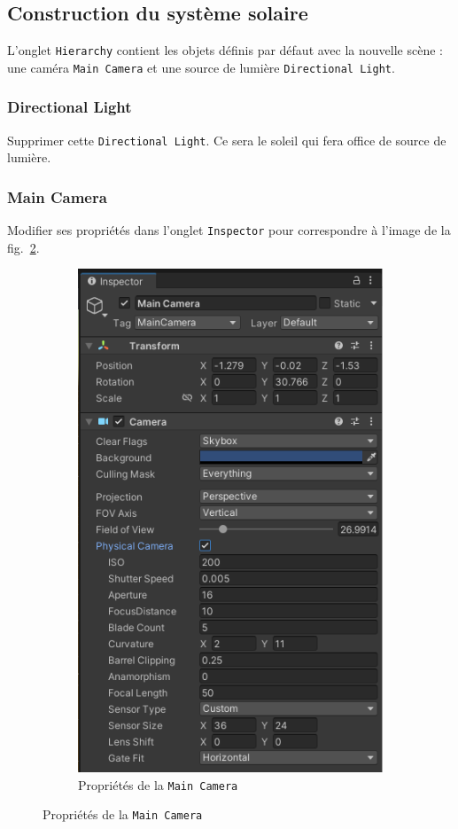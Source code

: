 \documentclass[a4paper,10pt]{article}
\newenvironment{solution}%
{\begin{tcolorbox}[breakable,colback=red!5!white,colframe=red!75!black,title=Solution]}%
{\end{tcolorbox}}
\begin{document}
\ifversionenseignant
\begin{solution}
\subsection{Construction du système solaire}

L'onglet \texttt{Hierarchy} contient les objets définis par défaut avec la nouvelle scène : une caméra \texttt{Main Camera} et une source de lumière \texttt{Directional Light}.

\subsubsection{Directional Light}

Supprimer cette \texttt{Directional Light}. Ce sera le soleil qui fera office de source de lumière.

\subsubsection{Main Camera}

Modifier ses propriétés dans l'onglet \texttt{Inspector} pour correspondre à l'image de la fig.~\ref{fig:main_camera_inspector-01}.
\end{solution}
\begin{figure}[h]
	\begin{subfigure}{\textwidth}
		\begin{center}
			\includegraphics[scale=.50]{fig/main_camera_inspector-01}
			\caption{Propriétés de la \texttt{Main Camera}}
			\label{fig:main_camera_inspector-01}
		\end{center}
	\end{subfigure}
\end{figure}
\end{document}
